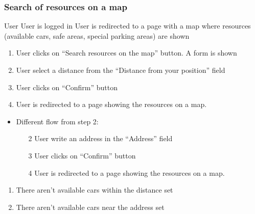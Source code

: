 \subsubsection{Search of resources on a map}\label{search2}
{User}
{}
{User is logged in}
{User is redirected to a page with a map where resources (available cars, safe areas, special parking areas)  are shown}
{
\begin{enumerate}
	\item User clicks on ``Search resources on the map'' button. A form is shown
	\item User select a distance from the ``Distance from your position'' field
	\item User clicks on ``Confirm'' button
	\item User is redirected to a page showing the resources on a map.
\end{enumerate}
}
{
\begin{itemize}
\item Different flow from step 2:
	\begin{enumerate}
	\item[2] User write an address in the ``Address'' field 
	\item[3] User clicks on ``Confirm'' button	
	\item[4] User is redirected to a page showing the resources on a map.
 
\end{enumerate}

\end{itemize}


}
{
\begin{enumerate}
\item There aren't available cars within the distance set 
\item There aren't available cars near the address set
\end{enumerate}

}
\pagebreak


